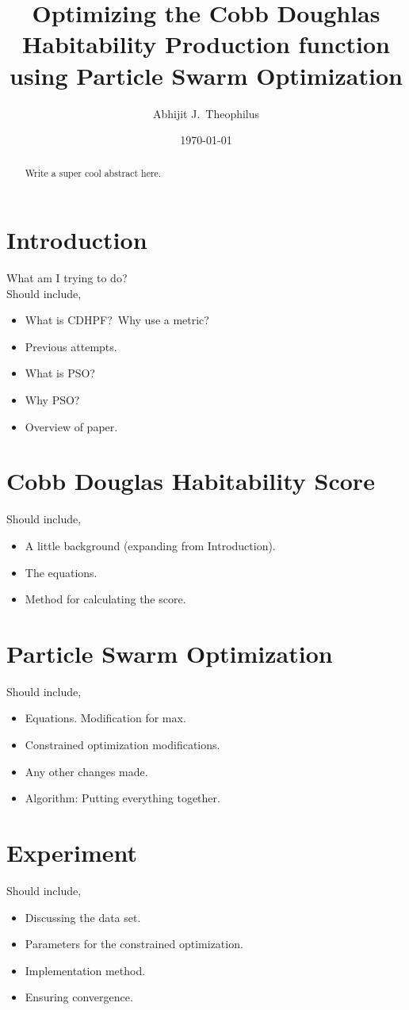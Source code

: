 \documentclass[10pt,a4paper]{article}
\title{Optimizing the Cobb Doughlas Habitability Production function using
Particle Swarm Optimization}
\author{Abhijit J.\ Theophilus}
\date{\today}
\newenvironment{pointers}{%
  \noindent Should include,
  \begin{itemize}
    \setlength{\itemsep}{-1pt}}{%
\end{itemize}}
\begin{document}
\maketitle

\begin{abstract}
  Write a super cool abstract here.
\end{abstract}


\section{Introduction}
What am I trying to do?\\

\begin{pointers}
\item What is CDHPF?\ Why use a metric?
\item Previous attempts.
\item What is PSO?\
\item Why PSO?\
\item Overview of paper.
\end{pointers}


\section{Cobb Douglas Habitability Score}
\begin{pointers}
\item A little background (expanding from Introduction).
\item The equations.
\item Method for calculating the score.
\end{pointers}


\section{Particle Swarm Optimization}
\begin{pointers}
\item Equations. Modification for max.
\item Constrained optimization modifications.
\item Any other changes made.
\item Algorithm: Putting everything together.
\end{pointers}


\section{Experiment}
\begin{pointers}
\item Discussing the data set.
\item Parameters for the constrained optimization.
\item Implementation method.
\item Ensuring convergence.
\end{pointers}
\end{document}
